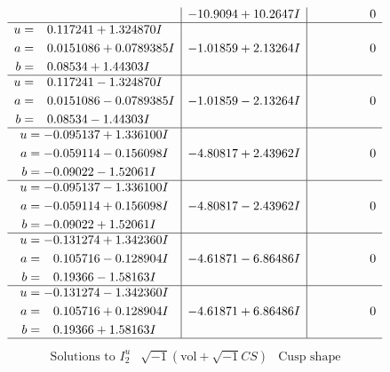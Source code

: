 \documentclass[1p]{elsarticle_modified}
\theoremstyle{definition}
\newcommand{\I}{\sqrt{-1}}
\begin{document}
$$\begin{array}{c|c|c}
 & -10.9094 + 10.2647 I & \phantom{-0.000000 } 0 \\ \hline\begin{aligned}
u &= \phantom{-}0.117241 + 1.324870 I \\
a &= \phantom{-}0.0151086 + 0.0789385 I \\
b &= \phantom{-}0.08534 + 1.44303 I\end{aligned}
 & -1.01859 + 2.13264 I & \phantom{-0.000000 } 0 \\ \hline\begin{aligned}
u &= \phantom{-}0.117241 - 1.324870 I \\
a &= \phantom{-}0.0151086 - 0.0789385 I \\
b &= \phantom{-}0.08534 - 1.44303 I\end{aligned}
 & -1.01859 - 2.13264 I & \phantom{-0.000000 } 0 \\ \hline\begin{aligned}
u &= -0.095137 + 1.336100 I \\
a &= -0.059114 - 0.156098 I \\
b &= -0.09022 - 1.52061 I\end{aligned}
 & -4.80817 + 2.43962 I & \phantom{-0.000000 } 0 \\ \hline\begin{aligned}
u &= -0.095137 - 1.336100 I \\
a &= -0.059114 + 0.156098 I \\
b &= -0.09022 + 1.52061 I\end{aligned}
 & -4.80817 - 2.43962 I & \phantom{-0.000000 } 0 \\ \hline\begin{aligned}
u &= -0.131274 + 1.342360 I \\
a &= \phantom{-}0.105716 - 0.128904 I \\
b &= \phantom{-}0.19366 - 1.58163 I\end{aligned}
 & -4.61871 - 6.86486 I & \phantom{-0.000000 } 0 \\ \hline\begin{aligned}
u &= -0.131274 - 1.342360 I \\
a &= \phantom{-}0.105716 + 0.128904 I \\
b &= \phantom{-}0.19366 + 1.58163 I\end{aligned}
 & -4.61871 + 6.86486 I & \phantom{-0.000000 } 0\\
 \hline 
 \end{array}$$\newpage$$\begin{array}{c|c|c}  
\text{Solutions to }I^u_{2}& \I (\text{vol} + \sqrt{-1}CS) & \text{Cusp shape}\\

\end{array}$$
\end{document}
